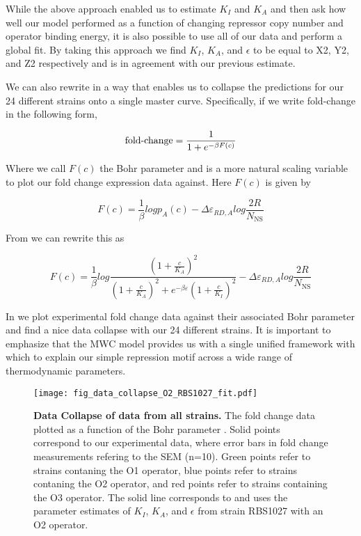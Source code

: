 While the above approach enabled us to estimate $K_I$ and $K_A$ and then ask how well our model performed as a function of changing repressor copy number and operator binding energy, it is also possible to use all of our data and perform a global fit. By taking this approach we find  $K_I$, $K_A$, and $\epsilon$ to be equal to X2, Y2, and Z2 respectively and is in agreement with our previous estimate.

We can also rewrite \eref[eq7] in a way that enables us to collapse the predictions for our 24 different strains onto a single master curve. Specifically, if we write fold-change in the following form,

\begin{equation}\label{eq8}
\operatorname{fold-change}= \frac{1}{1+e^{-\beta F(c)}}
\end{equation}

Where we call $F(c)$ the Bohr parameter \cite{Phillips2016} and is a more natural scaling variable to plot our fold change expression data against. Here $F(c)$ is given by

\begin{equation}\label{eq9}
F(c) =  \frac{1}{\beta} log p_A(c)
- \Delta\varepsilon_{RD,A} 
log \frac{2R}{N_{\text{NS}}} 
\end{equation}

From \eref[eq6v2] we can rewrite this as

\begin{equation}\label{eq10}
F(c) = \frac{1}{\beta} log \frac{\left(1+\frac{c}{K_A}\right)^2}{\left(1+\frac{c}{K_A}\right)^2+e^{-\beta  \varepsilon }\left(1+\frac{c}{K_I}\right)^2} - \Delta\varepsilon_{RD,A} log \frac{2R}{N_{\text{NS}}} 
\end{equation}

In  we plot experimental fold change data against their associated Bohr parameter and find a nice data collapse with our 24 different strains. It is important to emphasize that the MWC model provides us with a single unified framework with which to explain our simple repression motif across a wide range of thermodynamic parameters.

\begin{figure}[h]
	\centering \texttt{[image: fig\_data\_collapse\_O2\_RBS1027\_fit.pdf]}
	\caption{{\bf Data Collapse of data from all strains.} The fold change data plotted as a function of the Bohr parameter \eref[eq10].  Solid points correspond to our experimental data, where error bars in fold change measurements refering to the SEM (n=10). Green points refer to strains contaning the O1 operator, blue points refer to strains contaning the O2 operator, and red points refer to strains containing the O3 operator. The solid line corresponds to \eref[eq10] and uses the parameter estimates of $K_I$, $K_A$, and $\epsilon$ from strain RBS1027 with an O2 operator.}
	\label{fig_result3}
\end{figure}



